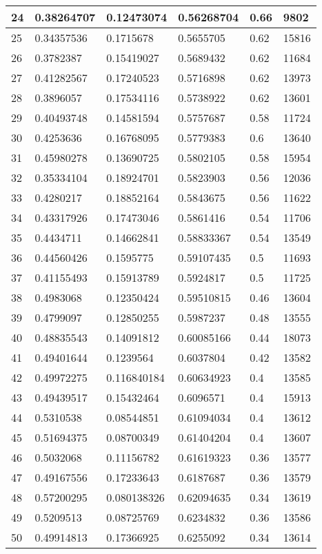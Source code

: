 \begin{longtable}{|l|l|l|l|l|l|}
24 & 0.38264707 & 0.12473074 & 0.56268704 & 0.66 & 9802 \\ \hline 
25 & 0.34357536 & 0.1715678 & 0.5655705 & 0.62 & 15816 \\ \hline 
26 & 0.3782387 & 0.15419027 & 0.5689432 & 0.62 & 11684 \\ \hline 
27 & 0.41282567 & 0.17240523 & 0.5716898 & 0.62 & 13973 \\ \hline 
28 & 0.3896057 & 0.17534116 & 0.5738922 & 0.62 & 13601 \\ \hline 
29 & 0.40493748 & 0.14581594 & 0.5757687 & 0.58 & 11724 \\ \hline 
30 & 0.4253636 & 0.16768095 & 0.5779383 & 0.6 & 13640 \\ \hline 
31 & 0.45980278 & 0.13690725 & 0.5802105 & 0.58 & 15954 \\ \hline 
32 & 0.35334104 & 0.18924701 & 0.5823903 & 0.56 & 12036 \\ \hline 
33 & 0.4280217 & 0.18852164 & 0.5843675 & 0.56 & 11622 \\ \hline 
34 & 0.43317926 & 0.17473046 & 0.5861416 & 0.54 & 11706 \\ \hline 
35 & 0.4434711 & 0.14662841 & 0.58833367 & 0.54 & 13549 \\ \hline 
36 & 0.44560426 & 0.1595775 & 0.59107435 & 0.5 & 11693 \\ \hline 
37 & 0.41155493 & 0.15913789 & 0.5924817 & 0.5 & 11725 \\ \hline 
38 & 0.4983068 & 0.12350424 & 0.59510815 & 0.46 & 13604 \\ \hline 
39 & 0.4799097 & 0.12850255 & 0.5987237 & 0.48 & 13555 \\ \hline 
40 & 0.48835543 & 0.14091812 & 0.60085166 & 0.44 & 18073 \\ \hline 
41 & 0.49401644 & 0.1239564 & 0.6037804 & 0.42 & 13582 \\ \hline 
42 & 0.49972275 & 0.116840184 & 0.60634923 & 0.4 & 13585 \\ \hline 
43 & 0.49439517 & 0.15432464 & 0.6096571 & 0.4 & 15913 \\ \hline 
44 & 0.5310538 & 0.08544851 & 0.61094034 & 0.4 & 13612 \\ \hline 
45 & 0.51694375 & 0.08700349 & 0.61404204 & 0.4 & 13607 \\ \hline 
46 & 0.5032068 & 0.11156782 & 0.61619323 & 0.36 & 13577 \\ \hline 
47 & 0.49167556 & 0.17233643 & 0.6187687 & 0.36 & 13579 \\ \hline 
48 & 0.57200295 & 0.080138326 & 0.62094635 & 0.34 & 13619 \\ \hline 
49 & 0.5209513 & 0.08725769 & 0.6234832 & 0.36 & 13586 \\ \hline 
50 & 0.49914813 & 0.17366925 & 0.6255092 & 0.34 & 13614 \\ \hline 
\end{longtable}